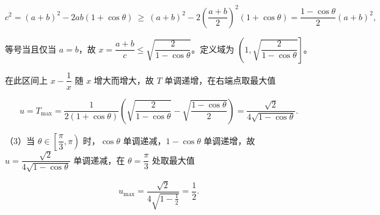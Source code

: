 \begin{answer}
\nopagebreak[4]
\[
c^{2}=(a+b)^{2}-2ab(1+\cos\theta)\ \ge\ (a+b)^{2}-2\left(\frac{a+b}{2}\right)^{2}(1+\cos\theta)
=\frac{1-\cos\theta}{2}(a+b)^{2},
\]

等号当且仅当 $a=b$，故 $x=\dfrac{a+b}{c}\le\sqrt{\dfrac{2}{1-\cos\theta}}$。定义域为 $\left(1,\sqrt{\dfrac{2}{1-\cos\theta}}\right]$。

在此区间上 $x-\dfrac{1}{x}$ 随 $x$ 增大而增大，故 $T$ 单调递增，在右端点取最大值

\nopagebreak[4]
\[
u=T_{\max}=\frac{1}{2(1+\cos\theta)}\left(\sqrt{\frac{2}{1-\cos\theta}}-\sqrt{\frac{1-\cos\theta}{2}}\right)
=\frac{\sqrt{2}}{4\sqrt{1-\cos\theta}}.
\]

（3）当 $\theta\in\left[\dfrac{\pi}{3},\pi\right)$ 时，$\cos\theta$ 单调递减，$1-\cos\theta$ 单调递增，故 $u=\dfrac{\sqrt{2}}{4\sqrt{1-\cos\theta}}$ 单调递减，在 $\theta=\dfrac{\pi}{3}$ 处取最大值

\nopagebreak[4]
\[
u_{\max}=\frac{\sqrt{2}}{4\sqrt{1-\frac{1}{2}}}=\frac{1}{2}.
\]

\gkanswer{答案：（1）$T=\dfrac{ab}{(a+b)c}$；（2）$T=\dfrac{1}{2(1+\cos\theta)}\left(x-\dfrac{1}{x}\right)$，定义域为 $\left(1,\sqrt{\dfrac{2}{1-\cos\theta}}\right]$，最大值 $u=\dfrac{\sqrt{2}}{4\sqrt{1-\cos\theta}}$；（3）$u$ 的最大值为 $\dfrac{1}{2}$。}

\end{answer}